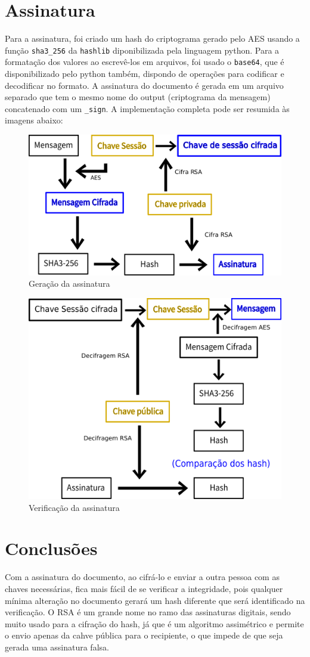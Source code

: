 \documentclass[12pt]{article}
\begin{document}
\section{Assinatura}

Para a assinatura, foi criado um hash do criptograma gerado pelo AES usando a função \texttt{sha3\_256} da \texttt{hashlib} diponibilizada pela linguagem python. Para a formatação dos valores ao escrevê-los em arquivos, foi usado o \texttt{base64}, que é disponibilizado pelo python também, dispondo de operações para codificar e decodificar no formato. A assinatura do documento é gerada em um arquivo separado que tem o mesmo nome do output (criptograma da mensagem) concatenado com um \texttt{\_sign}. A implementação completa pode ser resumida às imagens abaixo:

\begin{figure}[H]
	\centering
    \includegraphics[width=.65\textwidth]{img/assinatura.png}
    \caption{Geração da assinatura}
\end{figure}

\begin{figure}[H]
	\centering
    \includegraphics[width=.65\textwidth]{img/verificacao.png}
    \caption{Verificação da assinatura}
\end{figure}

\section{Conclusões}

Com a assinatura do documento, ao cifrá-lo e enviar a outra pessoa com as chaves necessárias, fica mais fácil de se verificar a integridade, pois qualquer mínima alteração no documento gerará um hash diferente que será identificado na verificação. O RSA é um grande nome no ramo das assinaturas digitais, sendo muito usado para a cifração do hash, já que é um algoritmo assimétrico e permite o envio apenas da cahve pública para o recipiente, o que impede de que seja gerada uma assinatura falsa.
\end{document}
